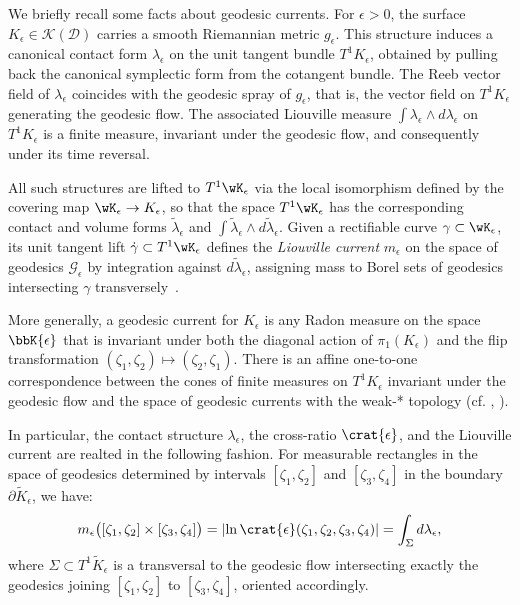 \documentclass[reqno,11pt]{amsart}
\begin{document}
    We briefly recall some facts about geodesic currents.
    For \( \epsilon > 0 \), the surface \( K_\epsilon \in \mathcal{K}(\mathcal{D}) \) carries a smooth Riemannian metric \( g_\epsilon \). 
    This structure induces a canonical contact form \( \lambda_\epsilon \) on the unit tangent bundle \( T^1 K_\epsilon \), obtained by pulling back the canonical symplectic form from the cotangent bundle.
    The Reeb vector field of \( \lambda_\epsilon \) coincides with the geodesic spray of \( g_\epsilon \), that is, the vector field on \( T^1 K_\epsilon \) generating the geodesic flow.
    The associated Liouville measure \( \int\lambda_\epsilon \wedge d\lambda_\epsilon \) on \( T^1 K_\epsilon \) is a finite measure, invariant under the geodesic flow, and consequently under its time reversal.
    \par All such structures are lifted to \(T^1\wK_\epsilon\) via the local isomorphism defined by the covering map \(\wK_\epsilon \to K_\epsilon\), so that the space \(T^1\wK_\epsilon\) has the corresponding contact and volume forms \(\widetilde{\lambda}_\epsilon\) and  \( \int\widetilde\lambda_\epsilon \wedge d\widetilde\lambda_\epsilon \). 
    Given a rectifiable curve \( \gamma \subset \wK_\epsilon \), its unit tangent lift \( \dot{\gamma} \subset T^1 \wK_\epsilon \) defines the \emph{Liouville current} \( m_\epsilon \) on the space of geodesics \( \mathcal{G}_\epsilon \) by integration against \( d\widetilde\lambda_\epsilon \), assigning mass to Borel sets of geodesics intersecting \( \gamma \) transversely~\cite{wilkinson_anosov}.
    \par More generally, a geodesic current for \(K_\epsilon\) is any Radon measure on the space \(\bbK{\epsilon}\) that is invariant under both the diagonal action of \(\pi_1(K_\epsilon)\) and the flip transformation \( (\zeta_1, \zeta_2) \mapsto (\zeta_2, \zeta_1)\).
    There is an affine one-to-one correspondence between the cones of finite measures on \(T^1K_\epsilon\) invariant under the geodesic flow and the space of geodesic currents with the weak-* topology (cf. \cite{bonahon_bouts_1986}, \cite{furman_coarse-geometric_2002}).
    \par In particular, the contact structure \( \lambda_\epsilon \), the cross-ratio \( \crat{\epsilon} \), and the Liouville current are realted in the following fashion. 
    For measurable rectangles in the space of geodesics determined by intervals \( [\zeta_1, \zeta_2] \) and \( [\zeta_3, \zeta_4] \) in the boundary \( \partial \widetilde{K}_\epsilon \), we have:
    \[
        m_\epsilon\big([\zeta_1, \zeta_2] \times [\zeta_3, \zeta_4]\big) 
        = \left| \ln \crat{\epsilon}(\zeta_1, \zeta_2, \zeta_3, \zeta_4) \right|
        = \int_{\Sigma} d\lambda_\epsilon,
    \]
    where \( \Sigma \subset T^1 \widetilde{K}_\epsilon \) is a transversal to the geodesic flow intersecting exactly the geodesics joining \( [\zeta_1, \zeta_2] \) to \( [\zeta_3, \zeta_4] \), oriented accordingly.
\end{document}
